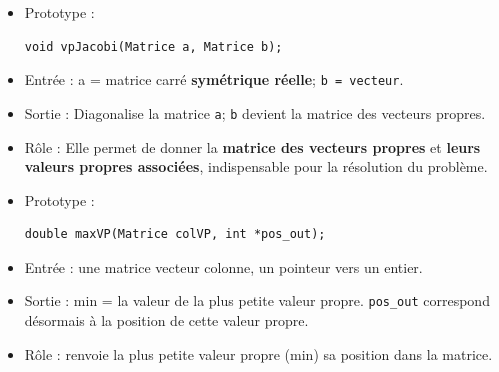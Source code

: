 \documentclass[12pt]{article}
\begin{document}

\begin{itemize}
    \item Prototype : 
    \begin{verbatim}
void vpJacobi(Matrice a, Matrice b);
    \end{verbatim}
    \item Entrée : a = matrice carré \textbf{symétrique réelle}; \texttt{b = vecteur}.
    \item Sortie : Diagonalise la matrice \texttt{a}; \texttt{b} devient la matrice des vecteurs propres.
    \item Rôle : Elle permet de donner la \textbf{matrice des vecteurs propres} et \textbf{leurs valeurs propres associées}, indispensable pour la résolution du problème.
\end{itemize}


\begin{itemize}
    \item Prototype : 
    \begin{verbatim}
double maxVP(Matrice colVP, int *pos_out);
    \end{verbatim}
    \item Entrée : une matrice vecteur colonne, un pointeur vers un entier.
    \item Sortie : min = la valeur de la plus petite valeur propre. \texttt{pos\_out} correspond désormais à la position de cette valeur propre.
    \item Rôle : renvoie la plus petite valeur propre (min) sa position dans la matrice.
\end{itemize}

    
\end{document}

